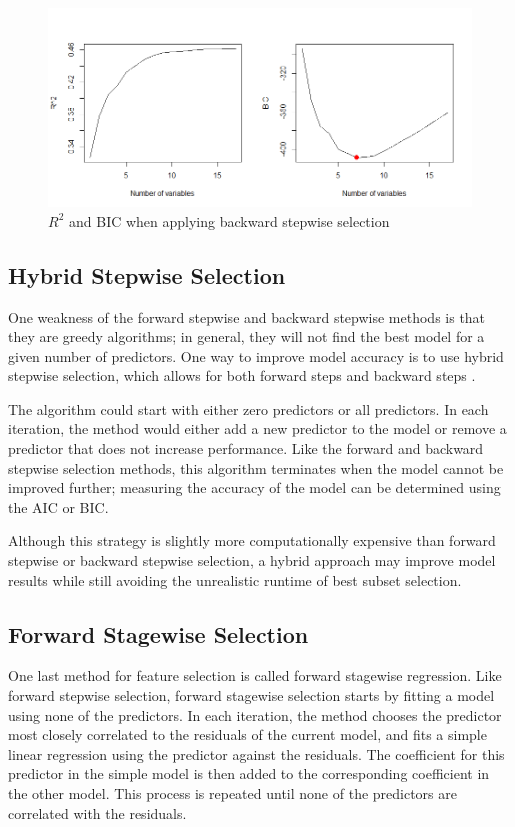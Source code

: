 \documentclass{article}
\begin{document}
\begin{figure}[!h]
	\centering
	\caption{$R^2$ and BIC when applying backward stepwise selection}
	\label{fig:backward-stepwise-selection}
	\includegraphics[width = 6in]{images/backward-stepwise-selection.png}
\end{figure}

\subsection{Hybrid Stepwise Selection}
One weakness of the forward stepwise and backward stepwise methods is that they are greedy algorithms; in general, they will not find the best model for a given number of predictors. One way to improve model accuracy is to use hybrid stepwise selection, which allows for both forward steps and backward steps \cite{friedman2001elements}.

The algorithm could start with either zero predictors or all predictors. In each iteration, the method would either add a new predictor to the model or remove a predictor that does not increase performance. Like the forward and backward stepwise selection methods, this algorithm terminates when the model cannot be improved further; measuring the accuracy of the model can be determined using the AIC or BIC.

Although this strategy is slightly more computationally expensive than forward stepwise or backward stepwise selection, a hybrid approach may improve model results while still avoiding the unrealistic runtime of best subset selection.

\subsection{Forward Stagewise Selection}
One last method for feature selection is called forward stagewise regression. Like forward stepwise selection, forward stagewise selection starts by fitting a model using none of the predictors. In each iteration, the method chooses the predictor most closely correlated to the residuals of the current model, and fits a simple linear regression using the predictor against the residuals. The coefficient for this predictor in the simple model is then added to the corresponding coefficient in the other model. This process is repeated until none of the predictors are correlated with the residuals.
\end{document}
